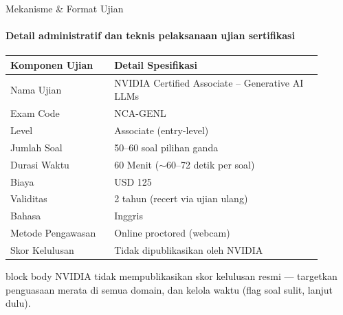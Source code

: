 \documentclass[aspectratio=169,t]{beamer}
\newcommand{\takeaway}[1]{%
  \vspace{0.1em}
  \begin{beamercolorbox}[rounded=true,shadow=false,sep=5pt]{block body}
    \centering\footnotesize\color{nvlightgreen}#1
  \end{beamercolorbox}%
}
\begin{document}
\begin{frame}{Mekanisme \& Format Ujian}
  \framesubtitle{Detail administratif dan teknis pelaksanaan ujian sertifikasi}
  \begin{center}
  \renewcommand{\arraystretch}{1.02}{\footnotesize\setlength{\tabcolsep}{10pt}
  \begin{tabular}{@{}p{0.3\linewidth}p{0.6\linewidth}@{}}
    \toprule \rowcolor{nvcard!50}
    \textbf{Komponen Ujian} & \textbf{Detail Spesifikasi} \\ \midrule
    Nama Ujian & NVIDIA Certified Associate -- Generative AI LLMs \\
    Exam Code & NCA-GENL \\
    Level & Associate (entry-level) \\
    Jumlah Soal & 50--60 soal pilihan ganda \\
    Durasi Waktu & 60 Menit ($\sim$60--72 detik per soal) \\
    Biaya & USD 125 \\
    Validitas & 2 tahun (recert via ujian ulang) \\
    Bahasa & Inggris \\
    Metode Pengawasan & Online proctored (webcam) \\
    Skor Kelulusan & Tidak dipublikasikan oleh NVIDIA \\
    \bottomrule
  \end{tabular}}
  \end{center}
  \takeaway{NVIDIA tidak mempublikasikan skor kelulusan resmi --- targetkan penguasaan merata di semua domain, dan kelola waktu (flag soal sulit, lanjut dulu).}
\end{frame}
\end{document}
